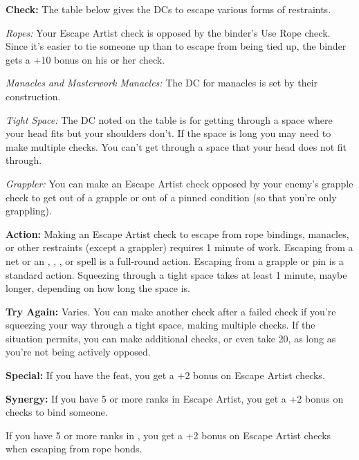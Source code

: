 \textbf{Check:} The table below gives the DCs to escape various forms of restraints.

\textit{Ropes:} Your Escape Artist check is opposed by the binder's Use Rope check. Since it's easier to tie someone up than to escape from being tied up, the binder gets a +10 bonus on his or her check.

\textit{Manacles and Masterwork Manacles:} The DC for manacles is set by their construction.

\textit{Tight Space:} The DC noted on the table is for getting through a space where your head fits but your shoulders don't. If the space is long you may need to make multiple checks. You can't get through a space that your head does not fit through.

\textit{Grappler:} You can make an Escape Artist check opposed by your enemy's grapple check to get out of a grapple or out of a pinned condition (so that you're only grappling).


\textbf{Action:} Making an Escape Artist check to escape from rope bindings, manacles, or other restraints (except a grappler) requires 1 minute of work. Escaping from a net or an , , , or  spell is a full-round action. Escaping from a grapple or pin is a standard action. Squeezing through a tight space takes at least 1 minute, maybe longer, depending on how long the space is.

\textbf{Try Again:} Varies. You can make another check after a failed check if you're squeezing your way through a tight space, making multiple checks. If the situation permits, you can make additional checks, or even take 20, as long as you're not being actively opposed.

\textbf{Special:} If you have the  feat, you get a +2 bonus on Escape Artist checks.

\textbf{Synergy:} If you have 5 or more ranks in Escape Artist, you get a +2 bonus on  checks to bind someone.

If you have 5 or more ranks in , you get a +2 bonus on Escape Artist checks when escaping from rope bonds.